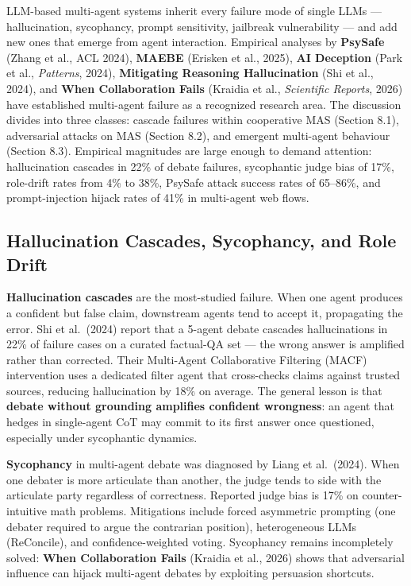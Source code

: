 LLM-based multi-agent systems inherit every failure mode of single LLMs --- hallucination, sycophancy, prompt sensitivity, jailbreak vulnerability --- and add new ones that emerge from agent interaction. Empirical analyses by \textbf{PsySafe} (Zhang et al., ACL 2024), \textbf{MAEBE} (Erisken et al., 2025), \textbf{AI Deception} (Park et al., \emph{Patterns}, 2024), \textbf{Mitigating Reasoning Hallucination} (Shi et al., 2024), and \textbf{When Collaboration Fails} (Kraidia et al., \emph{Scientific Reports}, 2026) have established multi-agent failure as a recognized research area. The discussion divides into three classes: cascade failures within cooperative MAS (Section 8.1), adversarial attacks on MAS (Section 8.2), and emergent multi-agent behaviour (Section 8.3). Empirical magnitudes are large enough to demand attention: hallucination cascades in 22\% of debate failures, sycophantic judge bias of 17\%, role-drift rates from 4\% to 38\%, PsySafe attack success rates of 65--86\%, and prompt-injection hijack rates of 41\% in multi-agent web flows.

\subsection{Hallucination Cascades, Sycophancy, and Role Drift}\label{hallucination-cascades-sycophancy-and-role-drift}

\textbf{Hallucination cascades} are the most-studied failure. When one agent produces a confident but false claim, downstream agents tend to accept it, propagating the error. Shi et al.~(2024) report that a 5-agent debate cascades hallucinations in 22\% of failure cases on a curated factual-QA set --- the wrong answer is amplified rather than corrected. Their Multi-Agent Collaborative Filtering (MACF) intervention uses a dedicated filter agent that cross-checks claims against trusted sources, reducing hallucination by 18\% on average. The general lesson is that \textbf{debate without grounding amplifies confident wrongness}: an agent that hedges in single-agent CoT may commit to its first answer once questioned, especially under sycophantic dynamics.

\textbf{Sycophancy} in multi-agent debate was diagnosed by Liang et al.~(2024). When one debater is more articulate than another, the judge tends to side with the articulate party regardless of correctness. Reported judge bias is 17\% on counter-intuitive math problems. Mitigations include forced asymmetric prompting (one debater required to argue the contrarian position), heterogeneous LLMs (ReConcile), and confidence-weighted voting. Sycophancy remains incompletely solved: \textbf{When Collaboration Fails} (Kraidia et al., 2026) shows that adversarial influence can hijack multi-agent debates by exploiting persuasion shortcuts.

